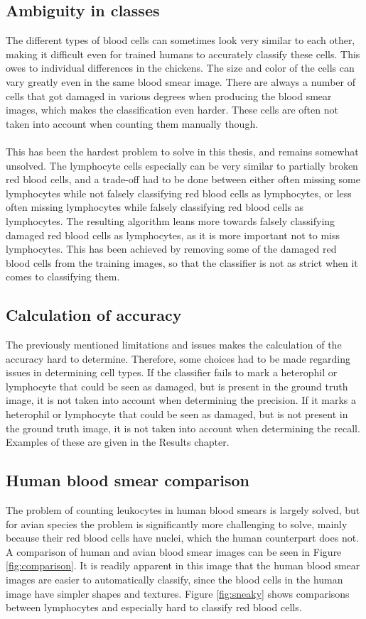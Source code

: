 \subsection{Ambiguity in classes}
The different types of blood cells can sometimes look very similar to each other, making it difficult even for trained humans to accurately classify these cells\cite{Bohls2006843}. This owes to individual differences in the chickens. The size and color of the cells can vary greatly even in the same blood smear image. There are always a number of cells that got damaged in various degrees when producing the blood smear images, which makes the classification even harder. These cells are often not taken into account when counting them manually though.\\\\
This has been the hardest problem to solve in this thesis, and remains somewhat unsolved. The lymphocyte cells especially can be very similar to partially broken red blood cells, and a trade-off had to be done between either often missing some lymphocytes while not falsely classifying red blood cells as lymphocytes, or less often missing lymphocytes while falsely classifying red blood cells as lymphocytes. The resulting algorithm leans more towards falsely classifying damaged red blood cells as lymphocytes, as it is more important not to miss lymphocytes. This has been achieved by removing some of the damaged red blood cells from the training images, so that the classifier is not as strict when it comes to classifying them.

\subsection{Calculation of accuracy}
The previously mentioned limitations and issues makes the calculation of the accuracy hard to determine. Therefore, some choices had to be made regarding issues in determining cell types. If the classifier fails to mark a heterophil or lymphocyte that could be seen as damaged, but is present in the ground truth image, it is not taken into account when determining the precision. If it marks a heterophil or lymphocyte that could be seen as damaged, but is not present in the ground truth image, it is not taken into account when determining the recall. Examples of these are given in the Results chapter.

\subsection{Human blood smear comparison}
The problem of counting leukocytes in human blood smears is largely solved\cite{5190593}\cite{hiremath2010automated}, but for avian species the problem is significantly more challenging to solve, mainly because their red blood cells have nuclei, which the human counterpart does not. A comparison of human and avian blood smear images can be seen in Figure \ref{fig:comparison}. It is readily apparent in this image that the human blood smear images are easier to automatically classify, since the blood cells in the human image have simpler shapes and textures. Figure \ref{fig:sneaky} shows comparisons between lymphocytes and especially hard to classify red blood cells.

